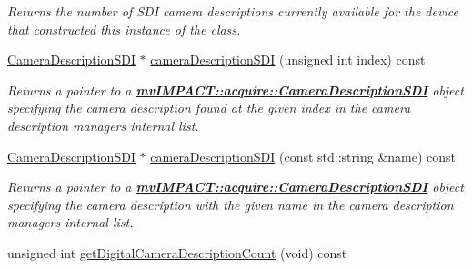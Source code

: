 \begin{DoxyCompactItemize}
\begin{DoxyCompactList}\small\item\em Returns the number of S\+D\+I camera descriptions currently available for the device that constructed this instance of the class. \end{DoxyCompactList}\item 
\hyperlink{classmv_i_m_p_a_c_t_1_1acquire_1_1_camera_description_s_d_i}{Camera\+Description\+S\+D\+I} $\ast$ \hyperlink{classmv_i_m_p_a_c_t_1_1acquire_1_1_camera_description_manager_a5ff91ebbca27cd1daac4a3a6f961cf01}{camera\+Description\+S\+D\+I} (unsigned int index) const 
\begin{DoxyCompactList}\small\item\em Returns a pointer to a {\bfseries \hyperlink{classmv_i_m_p_a_c_t_1_1acquire_1_1_camera_description_s_d_i}{mv\+I\+M\+P\+A\+C\+T\+::acquire\+::\+Camera\+Description\+S\+D\+I}} object specifying the camera description found at the given index in the camera description managers internal list. \end{DoxyCompactList}\item 
\hyperlink{classmv_i_m_p_a_c_t_1_1acquire_1_1_camera_description_s_d_i}{Camera\+Description\+S\+D\+I} $\ast$ \hyperlink{classmv_i_m_p_a_c_t_1_1acquire_1_1_camera_description_manager_a94082a599d42380f36acd4d658c92d13}{camera\+Description\+S\+D\+I} (const std\+::string \&name) const 
\begin{DoxyCompactList}\small\item\em Returns a pointer to a {\bfseries \hyperlink{classmv_i_m_p_a_c_t_1_1acquire_1_1_camera_description_s_d_i}{mv\+I\+M\+P\+A\+C\+T\+::acquire\+::\+Camera\+Description\+S\+D\+I}} object specifying the camera description with the given name in the camera description managers internal list. \end{DoxyCompactList}\item 
\hypertarget{classmv_i_m_p_a_c_t_1_1acquire_1_1_camera_description_manager_a01ccae7a4e14cd3b5111918a51c51409}{unsigned int \hyperlink{classmv_i_m_p_a_c_t_1_1acquire_1_1_camera_description_manager_a01ccae7a4e14cd3b5111918a51c51409}{get\+Digital\+Camera\+Description\+Count} (void) const }\label{classmv_i_m_p_a_c_t_1_1acquire_1_1_camera_description_manager_a01ccae7a4e14cd3b5111918a51c51409}


\end{DoxyCompactItemize}
